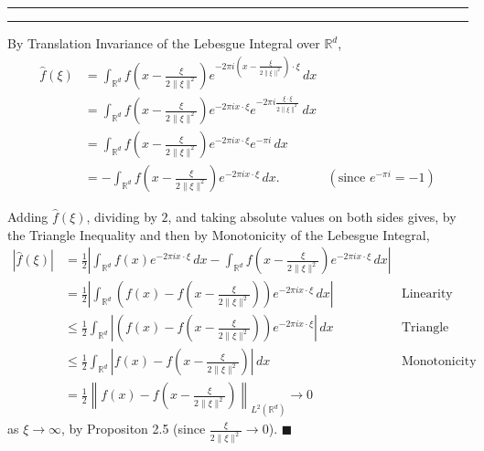 \documentclass[11pt]{article}
\newcounter{questionCounter}
\newcounter{partCounter}[questionCounter]
\newenvironment{question}[2][\arabic{questionCounter}]{%
    \setcounter{partCounter}{0}%
    \vspace{.25in} \hrule \vspace{0.5em}%
        \noindent{\bf #2}%
    \vspace{0.8em} \hrule \vspace{.10in}%
    \addtocounter{questionCounter}{1}%
}{}
\renewcommand{\qed}{\quad $\blacksquare$}
\newcommand{\R}{\mathbb{R}} %
\renewcommand{\'}{^{\prime}}
\begin{document}
\begin{question}{Page 93, Problem 22}
By Translation Invariance of the Lebesgue Integral over $\R^d$,
\begin{align*}
\hat{f}(\xi)
 & = \int_{\R^d} f\left( x - \frac{\xi}{2\|\xi\|^2} \right) e^{-2\pi i \left( x -
\frac{\xi}{2\|\xi\|^2} \right) \cdot \xi} \, dx \\
 & = \int_{\R^d} f\left( x - \frac{\xi}{2\|\xi\|^2} \right) e^{-2\pi ix \cdot
\xi} e^{-2\pi i\frac{\xi \cdot \xi}{2\|\xi\|^2}} \, dx \\
 & = \int_{\R^d} f\left( x - \frac{\xi}{2\|\xi\|^2} \right) e^{-2\pi ix \cdot
\xi} e^{-\pi i} \, dx \\
 & = - \int_{\R^d} f\left( x - \frac{\xi}{2\|\xi\|^2} \right) e^{-2\pi ix \cdot
\xi} \, dx. & (\mbox{since } e^{-\pi i} = -1)
\end{align*}

Adding $\hat{f}(\xi)$, dividing by $2$, and taking absolute values on both
sides gives, by the Triangle Inequality and then by Monotonicity of the
Lebesgue Integral,
\begin{align*}
|\hat{f}(\xi)|
 & =    \frac12 \left| \int_{\R^d} f(x) e^{-2\pi ix \cdot \xi} \, dx
                  - \int_{\R^d} f\left( x - \frac{\xi}{2\|\xi\|^2} \right)
                                        e^{-2\pi ix \cdot \xi} \, dx \right| \\
 & =    \frac12 \left| \int_{\R^d}
            \left( f(x) - f\left( x - \frac{\xi}{2\|\xi\|^2} \right) \right)
                                        e^{-2\pi ix \cdot \xi} \, dx \right|
         & \mbox{Linearity} \\
 & \leq \frac12 \int_{\R^d} \left| 
            \left( f(x) - f\left( x - \frac{\xi}{2\|\xi\|^2} \right) \right)
                                        e^{-2\pi ix \cdot \xi} \right| \, dx
         & \mbox{Triangle Inequality} \\
 & \leq \frac12 \int_{\R^d} \left| 
            f(x) - f\left( x - \frac{\xi}{2\|\xi\|^2} \right)
                                                               \right| \, dx
         & \mbox{Monotonicity} \\
 & = \frac12 \left\| f(x) - f\left( x - \frac{\xi}{2\|\xi\|^2} \right)
                                                        \right\|_{L^2(\R^d)}
   \rightarrow 0
\end{align*}
as $\xi \rightarrow \infty$, by Propositon 2.5 (since
$\frac{\xi}{2\|\xi\|^2} \rightarrow 0$). \qed
\end{question}
\end{document}
